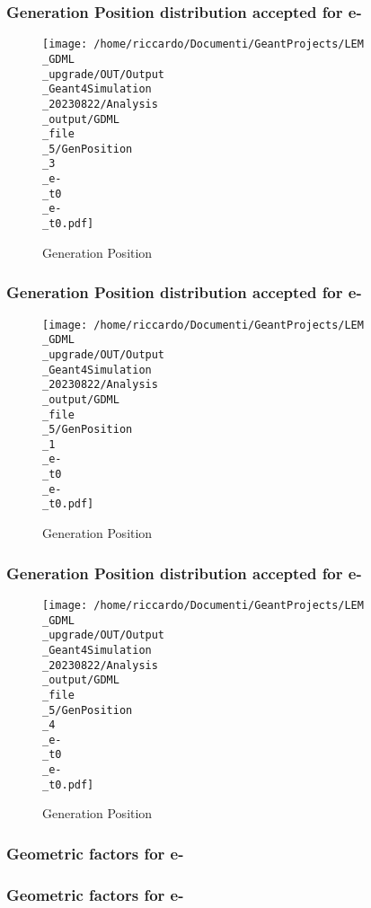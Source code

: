 \documentclass[8pt]{beamer}
\begin{document}
            \begin{frame}
                \frametitle{Generation Position distribution accepted for e-}
            
        \begin{figure}[h]
            \centering
            \texttt{[image: /home/riccardo/Documenti/GeantProjects/LEM\\\_GDML\\\_upgrade/OUT/Output\\\_Geant4Simulation\\\_20230822/Analysis\\\_output/GDML\\\_file\\\_5/GenPosition\\\_3\\\_e-\\\_t0\\\_e-\\\_t0.pdf]}
            \caption{Generation Position}
        \end{figure}
        
            \end{frame}
            
            \begin{frame}
                \frametitle{Generation Position distribution accepted for e-}
            
        \begin{figure}[h]
            \centering
            \texttt{[image: /home/riccardo/Documenti/GeantProjects/LEM\\\_GDML\\\_upgrade/OUT/Output\\\_Geant4Simulation\\\_20230822/Analysis\\\_output/GDML\\\_file\\\_5/GenPosition\\\_1\\\_e-\\\_t0\\\_e-\\\_t0.pdf]}
            \caption{Generation Position}
        \end{figure}
        
            \end{frame}
            
            \begin{frame}
                \frametitle{Generation Position distribution accepted for e-}
            
        \begin{figure}[h]
            \centering
            \texttt{[image: /home/riccardo/Documenti/GeantProjects/LEM\\\_GDML\\\_upgrade/OUT/Output\\\_Geant4Simulation\\\_20230822/Analysis\\\_output/GDML\\\_file\\\_5/GenPosition\\\_4\\\_e-\\\_t0\\\_e-\\\_t0.pdf]}
            \caption{Generation Position}
        \end{figure}
        
            \end{frame}
            
            \begin{frame}
                \frametitle{Geometric factors for e-}
            
            \end{frame}
            
            \begin{frame}
                \frametitle{Geometric factors for e-}
            
            \end{frame}
            
\end{document}
